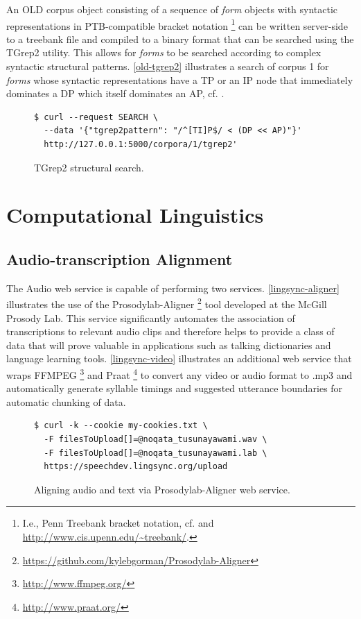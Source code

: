 \documentclass[11pt]{article}
\begin{document}
An OLD corpus object consisting of a sequence of \emph{form} objects with syntactic
representations in PTB-compatible bracket notation%
\footnote{I.e., Penn Treebank bracket notation, cf. \cite{taylor2003penn} and
\url{http://www.cis.upenn.edu/~treebank/}.} %
can be written server-side to a treebank file and compiled to a binary format
that can be searched using the TGrep2 utility. This allows for \emph{forms} to be
searched according to complex syntactic structural patterns. \autoref{old-tgrep2}
illustrates a search of corpus 1 for \emph{forms} whose syntactic
representations have a TP or an IP node that immediately dominates a DP which
itself dominates an AP, cf.  \cite{rohde2005tgrep2}.

\begin{figure}[h]
\scriptsize
\begin{verbatim}
$ curl --request SEARCH \
  --data '{"tgrep2pattern": "/^[TI]P$/ < (DP << AP)"}'
  http://127.0.0.1:5000/corpora/1/tgrep2'
\end{verbatim}
\normalsize
\caption{TGrep2 structural search.}
\label{old-tgrep2}
\end{figure}


\section{Computational Linguistics}


\subsection{Audio-transcription Alignment}
The Audio web service is capable of performing two services.
\autoref{lingsync-aligner} illustrates the use of the
Prosodylab-Aligner%
\footnote{\url{https://github.com/kylebgorman/Prosodylab-Aligner}} %
tool developed at the McGill Prosody Lab. This service significantly automates
the association of transcriptions to relevant audio clips and therefore helps
to provide a class of data that will prove valuable in applications such as
talking dictionaries and language learning tools. \autoref{lingsync-video}
illustrates an additional web service that wraps
FFMPEG%
\footnote{\url{http://www.ffmpeg.org/}} %
and Praat%
\footnote{\url{http://www.praat.org/}} %
to convert any video or audio format to .mp3 and automatically generate
syllable timings and suggested utterance boundaries for automatic chunking of
data.


\begin{figure}[h]
\scriptsize
\begin{verbatim}
$ curl -k --cookie my-cookies.txt \
  -F filesToUpload[]=@noqata_tusunayawami.wav \
  -F filesToUpload[]=@noqata_tusunayawami.lab \
  https://speechdev.lingsync.org/upload

\end{verbatim}
\normalsize
\caption{Aligning audio and text via Prosodylab-Aligner web service.}
\label{lingsync-aligner}
\end{figure}
\end{document}
